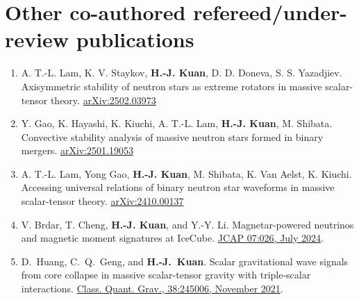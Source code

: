 \documentclass[10pt,floatfix,a4paper]{article}
\begin{document}
\section*{Other co-authored refereed/under-review publications}
\begin{enumerate}
	\item A. T.-L. Lam, K. V. Staykov, \textbf{H.-J. Kuan}, D. D. Doneva, S. S. Yazadjiev. Axisymmetric stability of neutron stars as extreme rotators in massive scalar-tensor theory. \href{https://arxiv.org/abs/2502.03973}{arXiv:2502.03973}
	\item Y. Gao, K. Hayashi, K. Kiuchi, A. T.-L. Lam, \textbf{H.-J. Kuan}, M. Shibata. Convective stability analysis of massive neutron stars formed in binary mergers. \href{https://arxiv.org/abs/2501.19053}{arXiv:2501.19053}
	\item A. T.-L. Lam, Yong Gao, \textbf{H.-J. Kuan}, M. Shibata, K. Van Aelst, K. Kiuchi. Accessing universal relations of binary neutron star waveforms in massive scalar-tensor theory. \href{https://arxiv.org/abs/2410.00137 }{arXiv:2410.00137}
	\item V. Brdar, T. Cheng, \textbf{H.-J. Kuan}, and Y.-Y. Li. Magnetar-powered neutrinos and magnetic moment signatures at IceCube. \href{https://iopscience.iop.org/article/10.1088/1475-7516/2024/07/026}{JCAP 07:026, July 2024}. 
	\item D.~Huang, C.~Q.~Geng, and \textbf{H.-J.~Kuan}. Scalar gravitational wave signals from core collapse in massive scalar-tensor gravity with triple-scalar interactions. \href{https://doi.org/10.1088/1361-6382/ac35ab}{Class. Quant. Grav., 38:245006, November 2021}.
\end{enumerate}
\end{document}
